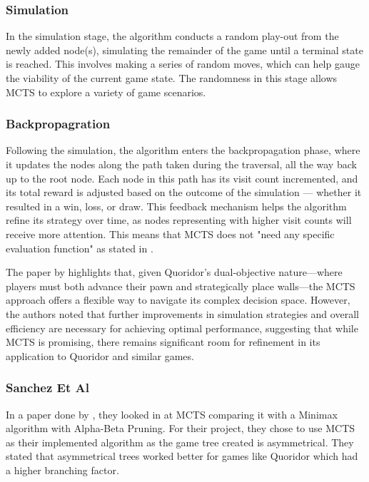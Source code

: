 \documentclass[review]{cmpreport}
\begin{document}
\subsubsection{Simulation}
In the simulation stage, the algorithm conducts a random play-out from the newly added node(s), simulating the remainder of the game until a terminal state is reached. This involves making a series of random moves, which can help gauge the viability of the current game state. The randomness in this stage allows MCTS to explore a variety of game scenarios.

\subsubsection{Backpropagration}
Following the simulation, the algorithm enters the backpropagation phase, where it updates the nodes along the path taken during the traversal, all the way back up to the root node. Each node in this path has its visit count incremented, and its total reward is adjusted based on the outcome of the simulation — whether it resulted in a win, loss, or draw. This feedback mechanism helps the algorithm refine its strategy over time, as nodes representing with higher visit counts will receive more attention. This means that MCTS does not "need any specific evaluation function" as stated in \cite{sanchez2018improving}.

\noindent The paper by \cite{respall2018monte} highlights that, given Quoridor's dual-objective nature—where players must both advance their pawn and strategically place walls—the MCTS approach offers a flexible way to navigate its complex decision space. However, the authors noted that further improvements in simulation strategies and overall efficiency are necessary for achieving optimal performance, suggesting that while MCTS is promising, there remains significant room for refinement in its application to Quoridor and similar games.

\subsubsection{Sanchez Et Al}
In a paper done by \cite{sanchez2018improving}, they looked in at MCTS comparing it with a Minimax algorithm with Alpha-Beta Pruning. For their project, they chose to use MCTS as their implemented algorithm as the game tree created is asymmetrical. They stated that asymmetrical trees worked better for games like Quoridor which had a higher branching factor.
\end{document}
